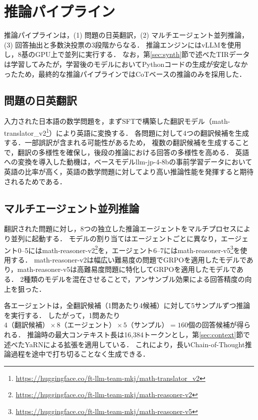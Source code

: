 \documentclass[
  platex, dvipdfmx,  %
]{nlp2026}
\begin{document}
\section{推論パイプライン}
\label{sec:inference}

推論パイプラインは，(1) 問題の日英翻訳，(2) マルチエージェント並列推論，(3) 回答抽出と多数決投票の3段階からなる．
推論エンジンにはvLLMを使用し，8基のGPU上で並列に実行する．
なお，第\ref{sec:synth}節で述べたTIRデータは学習してみたが，学習後のモデルにおいてPythonコードの生成が安定しなかったため，最終的な推論パイプラインではCoTベースの推論のみを採用した．

\subsection{問題の日英翻訳}

入力された日本語の数学問題を，まずSFTで構築した翻訳モデル（math-translator\_v2\footnote{\url{https://huggingface.co/ft-llm-team-mkj/math-translator_v2}}）により英語に変換する．
各問題に対して4つの翻訳候補を生成する．一部誤訳が含まれる可能性があるため，
複数の翻訳候補を生成することで，翻訳の多様性を確保し，後段の推論における回答の多様性を高める．
英語への変換を導入した動機は，ベースモデルllm-jp-4-8bの事前学習データにおいて英語の比率が高く，英語の数学問題に対してより高い推論性能を発揮すると期待されるためである．

\subsection{マルチエージェント並列推論}

翻訳された問題に対し，8つの独立した推論エージェントをマルチプロセスにより並列に起動する．
モデルの割り当てはエージェントごとに異なり，エージェント0--5にはmath-reasoner-v2\footnote{\url{https://huggingface.co/ft-llm-team-mkj/math-reasoner-v2}}を，エージェント6--7にはmath-reasoner-v5\footnote{\url{https://huggingface.co/ft-llm-team-mkj/math-reasoner-v5}}を使用する．
math-reasoner-v2は幅広い難易度の問題でGRPOを適用したモデルであり，math-reasoner-v5は高難易度問題に特化してGRPOを適用したモデルである．
2種類のモデルを混在させることで，アンサンブル効果による回答精度の向上を狙った．

各エージェントは，全翻訳候補（1問あたり4候補）に対して5サンプルずつ推論を実行する．
したがって，1問あたり$4\text{（翻訳候補）} \times 8\text{（エージェント）} \times 5\text{（サンプル）} = 160$個の回答候補が得られる．
推論時の最大コンテキスト長は16,384トークンとし，第\ref{sec:context}節で述べたYaRNによる拡張を適用している．
これにより，長いChain-of-Thought推論過程を途中で打ち切ることなく生成できる．
\end{document}
